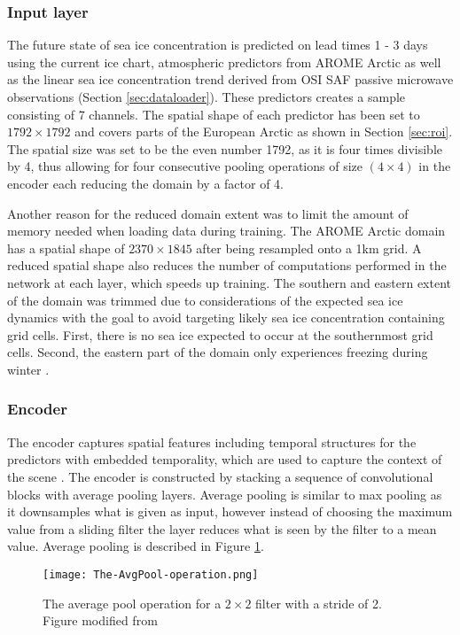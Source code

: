 \documentclass[../main/thesis]{subfiles}
\begin{document}
\subsubsection{Input layer}
The future state of sea ice concentration is predicted on lead times 1 - 3 days using the current ice chart, atmospheric predictors from AROME Arctic as well as the linear sea ice concentration trend derived from OSI SAF passive microwave observations (Section \ref{sec:dataloader}). These predictors creates a sample consisting of 7 channels. The spatial shape of each predictor has been set to $1792 \times 1792$ and covers parts of the European Arctic as shown in Section \ref{sec:roi}. The spatial size was set to be the even number 1792, as it is four times divisible by 4, thus allowing for four consecutive pooling operations of size $(4 \times 4)$ in the encoder \citep{Ronneberger2015} each reducing the domain by a factor of 4. 

Another reason for the reduced domain extent was to limit the amount of memory needed when loading data during training. The AROME Arctic domain has a spatial shape of $2370 \times 1845$ after being resampled onto a 1km grid. A reduced spatial shape also reduces the number of computations performed in the network at each layer, which speeds up training. The southern and eastern extent of the domain was trimmed due to considerations of the expected sea ice dynamics with the goal to avoid targeting likely sea ice concentration containing grid cells. First, there is no sea ice expected to occur at the southernmost grid cells. Second, the eastern part of the domain only experiences freezing during winter \citep{Serreze2019}.

\subsubsection{Encoder}
The encoder captures spatial features including temporal structures for the predictors with embedded temporality, which are used to capture the context of the scene \citep{Ronneberger2015}. The encoder is constructed by stacking a sequence of convolutional blocks with average pooling layers. Average pooling is similar to max pooling as it downsamples what is given as input, however instead of choosing the maximum value from a sliding filter the layer reduces what is seen by the filter to a mean value. Average pooling is described in Figure \ref{fig:avgpool}.

\begin{figure}
    \centering
    \texttt{[image: The-AvgPool-operation.png]}
    \caption{\label{fig:avgpool}The average pool operation for a $2 \times 2$ filter with a stride of 2. Figure modified from \protect\citet{MihaiDaniel2020}}
\end{figure}
\end{document}
